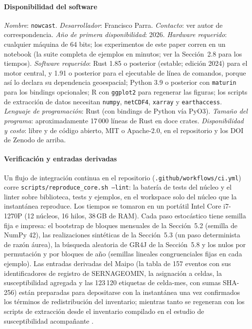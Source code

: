 \documentclass[authoryear,preprint,review,12pt]{elsarticle}
\begin{document}
\paragraph{Disponibilidad del software}
\emph{Nombre}: \texttt{nowcast}.
\emph{Desarrollador}: Francisco Parra.
\emph{Contacto}: ver autor de correspondencia.
\emph{Año de primera disponibilidad}: 2026.
\emph{Hardware requerido}: cualquier máquina de 64 bits; los experimentos de este
paper corren en un notebook (la suite completa de ejemplos en minutos; ver la
Sección~2.8 para los tiempos).
\emph{Software requerido}: Rust 1.85 o posterior (estable; edición 2024) para el motor central, y 1.91
o posterior para el ejecutable de línea de comandos, porque así lo declara su dependencia geoespacial;
Python 3.9 o posterior con \texttt{maturin} para los bindings opcionales; R con
\texttt{ggplot2} para regenerar las figuras; los scripts de extracción de datos
necesitan \texttt{numpy}, \texttt{netCDF4}, \texttt{xarray} y \texttt{earthaccess}.
\emph{Lenguaje de programación}: Rust (con bindings de Python vía PyO3).
\emph{Tamaño del programa}: aproximadamente 17\,000 líneas de Rust en doce crates.
\emph{Disponibilidad y costo}: libre y de código abierto, MIT o Apache-2.0, en el
repositorio y los DOI de Zenodo de arriba.

\paragraph{Verificación y entradas derivadas}
Un flujo de integración continua en el repositorio (\texttt{.github/workflows/ci.yml})
corre \texttt{scripts/reproduce\_core.sh --lint}: la batería de tests del núcleo y el
linter sobre biblioteca, tests y ejemplos, en el workspace solo del núcleo que la
instantánea reproduce. Los tiempos se tomaron en un portátil Intel Core i7-1270P (12
núcleos, 16 hilos, 38\,GB de RAM). Cada paso estocástico tiene semilla fija e impresa: el
bootstrap de bloques mensuales de la Sección~5.2 (semilla de NumPy 42), las
realizaciones sintéticas de la Sección~5.3 (un paso determinista de razón áurea), la
búsqueda aleatoria de GR4J de la Sección~5.8 y los nulos por permutación y por bloques
de año (semillas lineales congruenciales fijas en cada ejemplo). Las entradas derivadas
del Maipo (la tabla de 157 eventos con sus identificadores de registro de SERNAGEOMIN,
la asignación a celdas, la susceptibilidad agregada y las 123\,120 etiquetas de
celda-mes, con sumas SHA-256) están preparadas para depositarse con la instantánea una
vez confirmados los términos de redistribución del inventario; mientras tanto se
regeneran con los scripts de extracción desde el inventario compilado en el estudio de
susceptibilidad acompañante \citep{parra2026transfer}.
\end{document}
